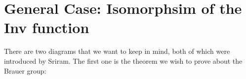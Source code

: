 












\author{Yuhui Yao}

\section{General Case: Isomorphsim of the Inv function}


There are two diagrams that we want to keep in mind, both of which were introduced by Sriram. The first one is the theorem we wish to prove about the Brauer group:


